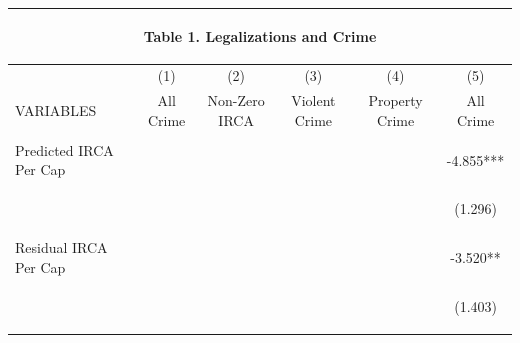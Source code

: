 \begin{center}
\begin{tabular}{lccccc}
\multicolumn{6}{c}{\begin{large}Table 1. Legalizations and Crime\end{large}} \\ \hline
 & (1) & (2) & (3) & (4) & (5) \\
VARIABLES & All Crime & Non-Zero IRCA & Violent Crime & Property Crime & All Crime \\ \hline
\vspace{4pt} & \begin{footnotesize}\end{footnotesize} & \begin{footnotesize}\end{footnotesize} & \begin{footnotesize}\end{footnotesize} & \begin{footnotesize}\end{footnotesize} & \begin{footnotesize}\end{footnotesize} \\
Predicted IRCA Per Cap &  &  &  &  & -4.855*** \\
\vspace{4pt} & \begin{footnotesize}\end{footnotesize} & \begin{footnotesize}\end{footnotesize} & \begin{footnotesize}\end{footnotesize} & \begin{footnotesize}\end{footnotesize} & \begin{footnotesize}(1.296)\end{footnotesize} \\
Residual IRCA Per Cap &  &  &  &  & -3.520** \\
\vspace{4pt} & \begin{footnotesize}\end{footnotesize} & \begin{footnotesize}\end{footnotesize} & \begin{footnotesize}\end{footnotesize} & \begin{footnotesize}\end{footnotesize} & \begin{footnotesize}(1.403)\end{footnotesize} \\

\end{tabular}
\end{center}
